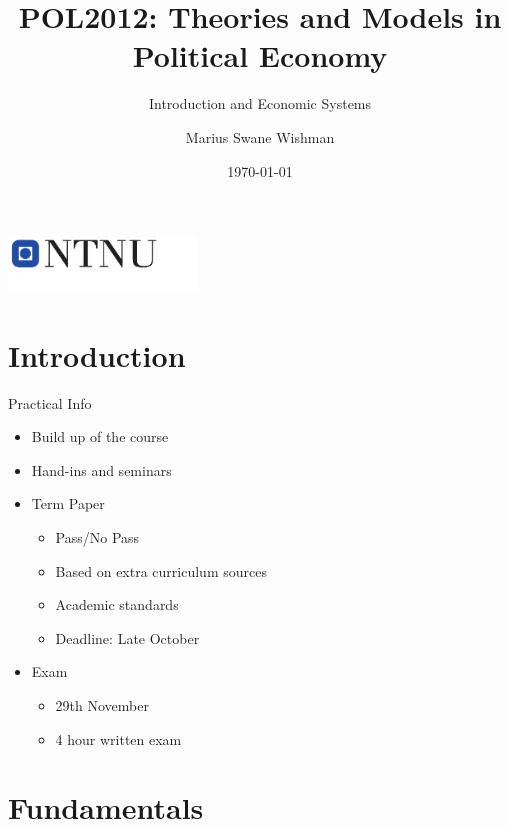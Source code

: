 \documentclass{beamer}
\title[POL2012]{POL2012: Theories and Models in Political Economy}
\subtitle{Introduction and Economic Systems}
\author[Wishman]{Marius Swane Wishman} %
\date[August 2019]{\today} %
\institute{Department of Sociology and Political Science}
\begin{document}
\begin{frame}[plain]
\titlepage %
\centering %
\includegraphics[width=5cm]{logo_ntnu_u-slagord.pdf}
\end{frame}


\section{Introduction} %


\begin{frame}{Practical Info}

    \begin{itemize}[<+- | alert@+>]
        \item Build up of the course
        \item Hand-ins and seminars
        \item Term Paper
         \begin{itemize}[<+- | alert@+>]
            \item Pass/No Pass
            \item Based on extra curriculum sources
            \item Academic standards
            \item Deadline: Late October
        \end{itemize}
        \item Exam
        \begin{itemize}[<+- | alert@+>]
            \item 29th November
            \item 4 hour written exam
        \end{itemize}
    \end{itemize}

\end{frame}

\section{Fundamentals}
\end{document}
